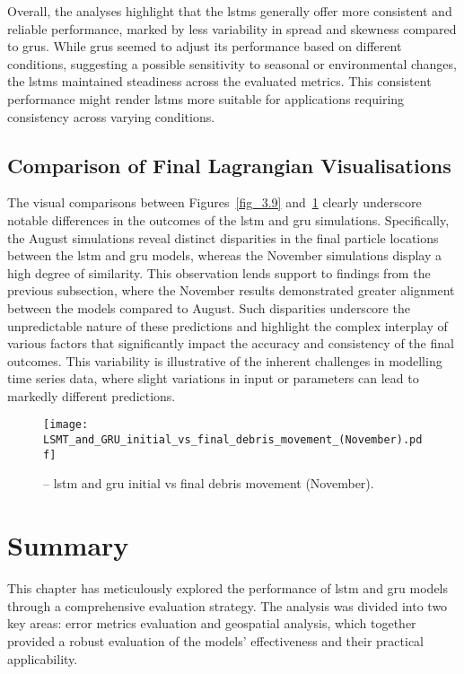 Overall, the analyses highlight that the \acrshort{lstm}s generally offer more consistent and reliable performance, marked by less variability in spread and skewness compared to \acrshort{gru}s. While \acrshort{gru}s seemed to adjust its performance based on different conditions, suggesting a possible sensitivity to seasonal or environmental changes, the \acrshort{lstm}s maintained steadiness across the evaluated metrics. This consistent performance might render \acrshort{lstm}s more suitable for applications requiring consistency across varying conditions.

\subsection{Comparison of Final Lagrangian Visualisations}
\label{subsec:4.2.4}

The visual comparisons between Figures~\ref{fig_3.9} and~\ref{fig_4.8} clearly underscore notable differences in the outcomes of the \acrshort{lstm} and \acrshort{gru} simulations. Specifically, the August simulations reveal distinct disparities in the final particle locations between the \acrshort{lstm} and \acrshort{gru} models, whereas the November simulations display a high degree of similarity. This observation lends support to findings from the previous subsection, where the November results demonstrated greater alignment between the models compared to August. Such disparities underscore the unpredictable nature of these predictions and highlight the complex interplay of various factors that significantly impact the accuracy and consistency of the final outcomes. This variability is illustrative of the inherent challenges in modelling time series data, where slight variations in input or parameters can lead to markedly different predictions.

\begin{figure}[htbp]
    \centering
    \texttt{[image: LSMT\_and\_GRU\_initial\_vs\_final\_debris\_movement\_(November).pdf]}
    \caption[LSTM and GRU initial vs final debris movement (November).]{-- \acrshort{lstm} and \acrshort{gru} initial vs final debris movement (November).\label{fig_4.8}}
\end{figure}

\section{Summary}
\label{sec:4.3}

This chapter has meticulously explored the performance of \acrshort{lstm} and \acrshort{gru} models through a comprehensive evaluation strategy. The analysis was divided into two key areas: error metrics evaluation and geospatial analysis, which together provided a robust evaluation of the models' effectiveness and their practical applicability. 

